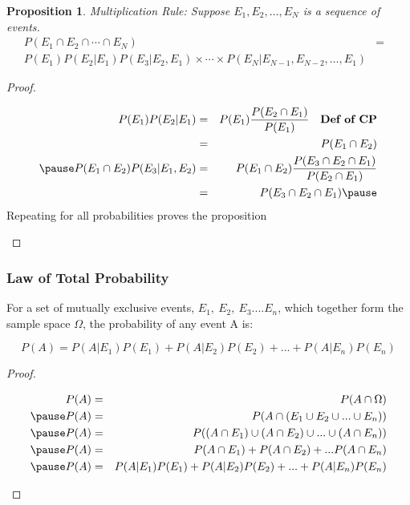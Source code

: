 \documentclass[handout]{beamer}
\newtheorem{prop}{Proposition}
\numberwithin{equation}{section}
\begin{document}
\begin{frame}
\begin{prop} 
Multiplication Rule: 
Suppose $E_{1}, E_{2}, \hdots, E_{N}$ is a sequence of events.  
\begin{eqnarray}
P(E_{1}\cap E_{2}\cap \cdots \cap E_{N} ) & =& \nonumber \\
P(E_{1})P(E_{2}|E_{1}) P(E_{3}|E_2, E_{1} ) \times \cdots \times P(E_{N} | E_{N-1}, E_{N-2} , \hdots, E_{1} )  && \nonumber
\end{eqnarray}
\end{prop} 

\pause 
\begin{proof} 
\begin{small}
\begin{eqnarray}
P(E_{1}) P(E_{2}| E_{1} ) & = & P(E_{1}) \frac{P(E_{2} \cap E_{1} )}{P(E_{1})} \quad \textbf{Def of CP} \nonumber \\
& = & P(E_{1} \cap E_{2} ) \nonumber \\ \pause 
P(E_{1} \cap E_{2} ) P(E_{3}| E_{1}, E_{2} ) &= & P(E_{1} \cap E_{2} ) \frac{P(E_{3} \cap E_{2} \cap E_{1} )  }{P(E_{2} \cap E_{1} ) } \nonumber \\
& = & P(E_{3} \cap E_{2} \cap E_{1} )  \nonumber  \pause 
\end{eqnarray}
Repeating for all probabilities proves the proposition

\end{small}

\end{proof}


\end{frame}


\begin{frame}
\frametitle{Law of Total Probability}

For a set of mutually exclusive events, $E_1,\  E_2,\ E_3 .... E_n$, which together form the sample space $\Omega$, the probability of any event A is:

$$P(A)= P(A|E_1)P(E_1)+P(A|E_2)P(E_2)+...+P(A|E_n)P(E_n)$$
\pause
\begin{proof} 
\begin{small}
\begin{eqnarray}
P(A)& = &P(A\cap \Omega)  \nonumber  \\\pause
P(A)& = &P(A\cap (E_1\cup E_2 \cup ... \cup E_n))  \nonumber \\\pause
P(A)& = &P((A\cap E_1)\cup (A\cap E_2) \cup ... \cup(A\cap E_n)) \nonumber\\ \pause
P(A)& = & P(A\cap E_1)+ P(A\cap E_2) + ...P(A\cap E_n) \nonumber \\\pause
P(A)& = & P(A|E_1)P(E_1)+P(A|E_2)P(E_2)+...+P(A|E_n)P(E_n) \nonumber 
\end{eqnarray}
\end{small}

\end{proof}


\end{frame}
\end{document}
